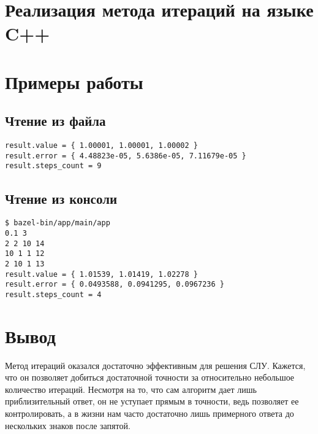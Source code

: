 \documentclass{article}
\begin{document}


\section{Реализация метода итераций на языке C++}



\section{Примеры работы}
\subsection{Чтение из файла}



\begin{lstlisting}[caption={Вывод программы 1}]
result.value = { 1.00001, 1.00001, 1.00002 }
result.error = { 4.48823e-05, 5.6386e-05, 7.11679e-05 }
result.steps_count = 9
\end{lstlisting}

\subsection{Чтение из консоли}

\begin{lstlisting}[caption={Использование программы из консоли}]
$ bazel-bin/app/main/app
0.1 3
2 2 10 14
10 1 1 12
2 10 1 13
result.value = { 1.01539, 1.01419, 1.02278 }
result.error = { 0.0493588, 0.0941295, 0.0967236 }
result.steps_count = 4
\end{lstlisting}


\section{Вывод}

Метод итераций оказался достаточно эффективным
для решения СЛУ. Кажется, что он позволяет
добиться достаточной точности за относительно
небольшое количество итераций. Несмотря
на то, что сам алгоритм дает лишь
приблизительный ответ, он не уступает прямым
в точности, ведь позволяет ее контролировать,
а в жизни нам часто достаточно лишь примерного
ответа до нескольких знаков после запятой.
\end{document}
